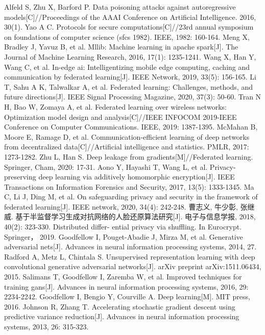\documentclass[12pt,openany,a4paper,fancyhdr,oneside]{ctexbook}
\begin{document}
\begin{thebibliography}{99}
Alfeld S, Zhu X, Barford P. Data poisoning attacks against autoregressive models[C]//Proceedings of the AAAI Conference on Artificial Intelligence. 2016, 30(1).
Yao A C. Protocols for secure computations[C]//23rd annual symposium on foundations of computer science (sfcs 1982). IEEE, 1982: 160-164.
Meng X, Bradley J, Yavuz B, et al. Mllib: Machine learning in apache spark[J]. The Journal of Machine Learning Research, 2016, 17(1): 1235-1241.
Wang X, Han Y, Wang C, et al. In-edge ai: Intelligentizing mobile edge computing, caching and communication by federated learning[J]. IEEE Network, 2019, 33(5): 156-165.
Li T, Sahu A K, Talwalkar A, et al. Federated learning: Challenges, methods, and future directions[J]. IEEE Signal Processing Magazine, 2020, 37(3): 50-60.
Tran N H, Bao W, Zomaya A, et al. Federated learning over wireless networks: Optimization model design and analysis[C]//IEEE INFOCOM 2019-IEEE Conference on Computer Communications. IEEE, 2019: 1387-1395.
McMahan B, Moore E, Ramage D, et al. Communication-efficient learning of deep networks from decentralized data[C]//Artificial intelligence and statistics. PMLR, 2017: 1273-1282.
Zhu L, Han S. Deep leakage from gradients[M]//Federated learning. Springer, Cham, 2020: 17-31.
Aono Y, Hayashi T, Wang L, et al. Privacy-preserving deep learning via additively homomorphic encryption[J]. IEEE Transactions on Information Forensics and Security, 2017, 13(5): 1333-1345.
Ma C, Li J, Ding M, et al. On safeguarding privacy and security in the framework of federated learning[J]. IEEE network, 2020, 34(4): 242-248.
曹志义, 牛少彰, 张继威. 基于半监督学习生成对抗网络的人脸还原算法研究[J]. 电子与信息学报, 2018, 40(2): 323-330. Distributed differ- ential privacy via shuffling. In Eurocrypt. Springer， 2019.
Goodfellow I, Pouget-Abadie J, Mirza M, et al. Generative adversarial nets[J]. Advances in neural information processing systems, 2014, 27.
Radford A, Metz L, Chintala S. Unsupervised representation learning with deep convolutional generative adversarial networks[J]. arXiv preprint arXiv:1511.06434, 2015.
Salimans T, Goodfellow I, Zaremba W, et al. Improved techniques for training gans[J]. Advances in neural information processing systems, 2016, 29: 2234-2242.
Goodfellow I, Bengio Y, Courville A. Deep learning[M]. MIT press, 2016.
Johnson R, Zhang T. Accelerating stochastic gradient descent using predictive variance reduction[J]. Advances in neural information processing systems, 2013, 26: 315-323.

\end{thebibliography}
\end{document}
